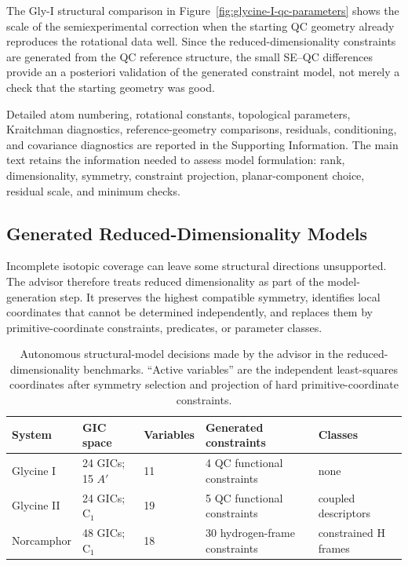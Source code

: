 \documentclass[aip,jcp,reprint,longbibliography,floatfix]{revtex4-2}
\begin{document}
The Gly-I structural comparison in
Figure~\ref{fig:glycine-I-qc-parameters} shows the scale of the
semiexperimental correction when the starting QC geometry already reproduces
the rotational data well. Since the reduced-dimensionality constraints are
generated from the QC reference structure, the small SE--QC differences
provide an a posteriori validation of the generated constraint
model, not merely a check that the starting geometry was good.

Detailed atom numbering, rotational constants, topological parameters,
Kraitchman diagnostics, reference-geometry comparisons, residuals, conditioning, and
covariance diagnostics are reported in the Supporting Information. The main text 
retains the information needed to
assess model formulation: rank, dimensionality, symmetry, constraint
projection, planar-component choice, residual scale, and minimum checks.

\subsection{Generated Reduced-Dimensionality Models}

Incomplete isotopic coverage can leave some structural directions unsupported.
The advisor therefore treats reduced dimensionality as part of the
model-generation step. It preserves the highest compatible symmetry, identifies
local coordinates that cannot be determined independently, and replaces them
by primitive-coordinate constraints, predicates, or parameter classes. 

\begin{table}
\caption{Autonomous structural-model decisions made by the advisor in the
reduced-dimensionality benchmarks. ``Active variables'' are the
independent least-squares coordinates after symmetry selection and projection
of hard primitive-coordinate constraints.}
\label{tab:advisor-decisions}
\scriptsize
\setlength{\tabcolsep}{2.5pt}
\begin{tabular}{lllll}
\toprule
System & GIC space & Variables & Generated constraints & Classes \\
\midrule
Glycine I & 24 GICs; 15 $A'$ & 11 & 4 QC functional constraints & none \\
Glycine II & 24 GICs; C$_1$ & 19 & 5 QC functional constraints & coupled descriptors \\
Norcamphor & 48 GICs; C$_1$ & 18 & 30 hydrogen-frame constraints & constrained H frames \\
\bottomrule
\end{tabular}
\end{table}
\end{document}
